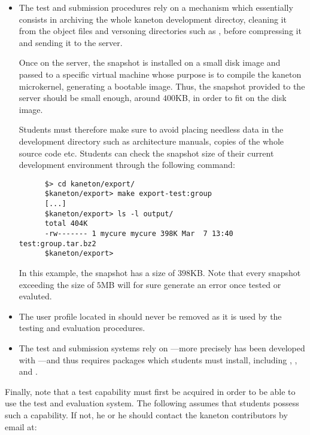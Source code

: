 \begin{itemize}
  \item
    The test and submission procedures rely on a mechanism which essentially
    consists in archiving the whole kaneton development directoy, cleaning it
    from the object files and versoning directories such as ,
     \etc{} before compressing it and sending it to the server.

    \-

    Once on the server, the snapshot is installed on a small disk image and
    passed to a specific virtual machine whose purpose is to compile the
    kaneton microkernel, generating a bootable image. Thus, the snapshot
    provided to the server should be small enough, around $400$KB, in order
    to fit on the disk image.

    \-

    Students must therefore make sure to avoid placing needless data in
    the development directory such as architecture manuals, copies of
    the whole source code etc. Students can check the snapshot size of their
    current development environment through the following command:

    \begin{verbatim}
      $> cd kaneton/export/
      $kaneton/export> make export-test:group
      [...]
      $kaneton/export> ls -l output/
      total 404K
      -rw------- 1 mycure mycure 398K Mar  7 13:40 test:group.tar.bz2
      $kaneton/export>
    \end{verbatim}

    In this example, the snapshot has a size of $398$KB. Note that every
    snapshot exceeding the size of $5$MB will for sure generate an error
    once tested or evaluted.
  \item
    The  user profile located in
     should never be removed as
    it is used by the testing and evaluation procedures.
  \item
    The test and submission systems rely on ---more precisely
    has been developed with ---and thus requires packages
    which students must install, including , ,
     and .
\end{itemize}

Finally, note that a test capability must first be acquired in order to be
able to use the test and evaluation system. The following assumes that
students possess such a capability. If not, he or he should contact the
kaneton contributors by email at:

